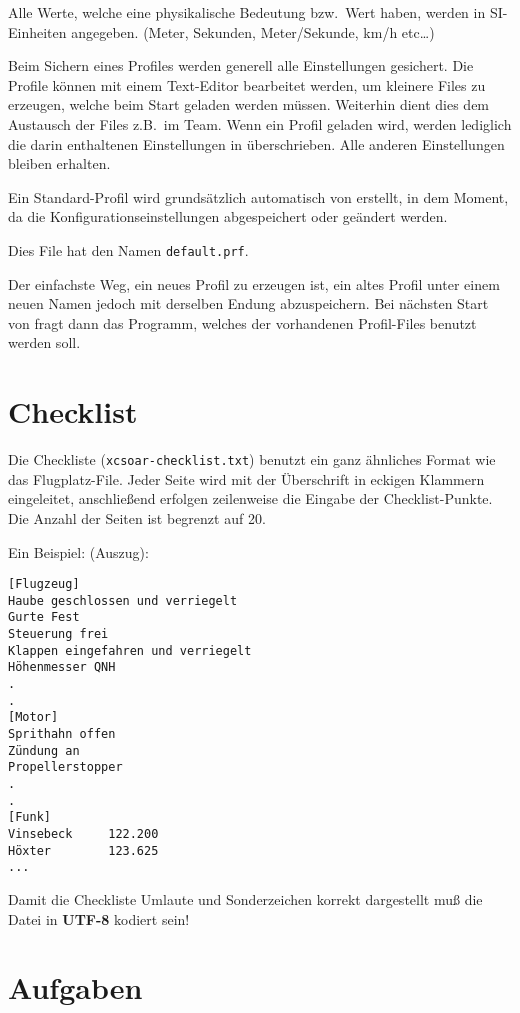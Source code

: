 {{{{Alle Werte, welche eine physikalische Bedeutung bzw.\ Wert haben, werden in \textsf{SI}-Einheiten angegeben.
(Meter, Sekunden, Meter/Sekunde, km/h etc\dots)

Beim Sichern eines Profiles werden generell alle Einstellungen gesichert.
Die Profile können mit einem Text-Editor bearbeitet werden, um kleinere Files zu erzeugen,
welche beim Start geladen werden müssen. Weiterhin dient dies dem Austausch der Files
z.B.\ im Team. Wenn ein Profil geladen wird, werden lediglich die darin enthaltenen
Einstellungen in \xc überschrieben. Alle anderen Einstellungen bleiben erhalten.

Ein Standard-Profil wird grundsätzlich automatisch von  \xc erstellt, in dem Moment, da
die Konfigurationseinstellungen abgespeichert oder geändert werden.

Dies File hat den Namen  \verb|default.prf|.

Der einfachste Weg, ein neues Profil zu erzeugen ist, ein altes Profil unter einem neuen
Namen jedoch mit derselben Endung abzuspeichern. Bei nächsten Start von \xc  fragt dann das Programm, welches der vorhandenen Profil-Files benutzt werden soll.


\section{Checklist}\label{sec:checklist-file}

Die Checkliste  (\verb|xcsoar-checklist.txt|) benutzt ein ganz ähnliches Format
wie das Flugplatz-File. 
Jeder Seite wird mit der Überschrift in eckigen Klammern eingeleitet, anschließend erfolgen
zeilenweise die Eingabe der Checklist-Punkte. Die Anzahl der Seiten ist begrenzt auf 20.

Ein Beispiel: (Auszug):
\begin{verbatim}
[Flugzeug]
Haube geschlossen und verriegelt
Gurte Fest
Steuerung frei
Klappen eingefahren und verriegelt
Höhenmesser QNH
.
.
[Motor]
Sprithahn offen
Zündung an
Propellerstopper 
.
.
[Funk]
Vinsebeck     122.200
Höxter        123.625
...
\end{verbatim}
Damit die Checkliste Umlaute und Sonderzeichen korrekt dargestellt muß die Datei \warning 
in \textbf{UTF-8} kodiert sein!


\section{Aufgaben }

}}}}
